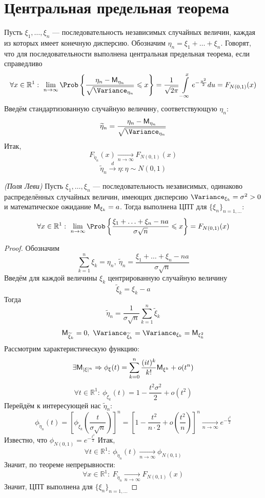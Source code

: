 \section{Центральная предельная теорема}
Пусть $\xi_1, \ldots, \xi_n$ --- последовательность независимых случайных величин, каждая из которых имеет конечную дисперсию. Обозначим $\eta_n = \xi_1 + \ldots + \xi_n$. Говорят, что для последовательности выполнена центральная предельная теорема, если справедливо
\[
	\forall x \in \mathbb{R}^1: \ \lim\limits_{n \to \infty} \Prob \left\{ \frac{\eta_n - \MExpect_{\eta_n}}{\sqrt{\Variance_{\eta_n}}} \leqslant x \right\} = \frac{1}{\sqrt{2 \pi}} \int\limits_{-\infty}^{x} e^{- \frac{u^2}{2}} du = F_{N(0,1)} (x)
\]
Введём стандартизованную случайную величину, соответствующую $\eta_n$:
\[
	\widetilde{\eta}_n = \frac{\eta_n - \MExpect_{\eta_n}}{\sqrt{\Variance_{\eta_n}}}
\]
Итак,
\[
	F_{\widetilde{\eta}_n} (x) \underset{n \to \infty}{\rightarrow} F_{N(0, 1)} (x)
\]
\[
	\widetilde{\eta}_n \overset{d}{\rightarrow} \eta: \eta \sim N(0, 1)
\]
\begin{theorem}
	\textit{(Поля Леви)} Пусть $\xi_1, \ldots, \xi_n$ --- последовательность независимых, одинаково распределённых случайных величин, имеющих дисперсию $\Variance_{\xi_k} = \sigma^2 > 0$ и математическое ожидание $\mathsf{M}_{\xi_k} = a$. Тогда выполнена ЦПТ для $\{ \xi_n \}_{n = 1, \ldots}$:
\[
	\forall x \in \mathbb{R}^1: \ \lim\limits_{n \to \infty} \Prob \left\{ \frac{\xi_1 + \ldots + \xi_n - na}{\sigma \sqrt{n}} \leqslant x \right\} = F_{N(0, 1)} (x)
\]
\end{theorem}
\begin{proof}
	Обозначим
	\[
		\sum\limits_{k = 1}^{n} \xi_k = \eta_n, \ \widetilde{\eta}_n = \frac{\xi_1 + \ldots + \xi_n - na}{\sigma \sqrt{n}} 
	\]
	Введём для каждой величины $\xi_k$ центрированную случайную величину
	\[
		\widetilde{\xi}_k = \xi_k - a
	\]
	Тогда
	\[
		\widetilde{\eta}_n = \frac{1}{\sigma \sqrt{n}} \sum\limits_{k = 1}^{n} \widetilde{\xi}_k
	\]
	\[
		\MExpect_{\widetilde{\xi}_k} = 0, \ \Variance_{\widetilde{\xi}_k} = \Variance_{\xi_k} = \MExpect_{\xi_k^2}
	\]
	Рассмотрим характеристическую функцию:
	\[
		\exists \mathsf{M}_{|\xi|^n} \Rightarrow \phi_{\xi} (t) = \sum\limits_{k = 0}^{n} \frac{(it)^k}{k!} \mathsf{M}_{\xi^k} + o(t^n)
	\]
	\[
		\forall t \in \mathbb{R}^1: \ \phi_{{\widetilde{\xi}_k}} (t) = 1 - \frac{t^2 \sigma^2}{2} + o(t^2)
	\]
	Перейдём к интересующей нас $\widetilde{\eta}_n$:
	\[
		\phi_{\widetilde{\eta}_n} (t) = \left[ \phi_{\widetilde{\xi}_k} \left( \frac{t}{\sigma \sqrt{n}} \right) \right]^n = \left[ 1 - \frac{t^2}{n \cdot 2} + o \left( \frac{t^2}{n} \right) \right]^n \underset{n \to \infty}{\rightarrow} e^{- \frac{t^2}{2}}
	\]
	Известно, что $\phi_{N(0, 1)} = e^{- \frac{t^2}{2}}$
	Итак,
	\[
		\forall t \in \mathbb{R}^1: \ \phi_{\widetilde{\eta}_n} (t) \underset{n \to \infty}{\rightarrow} \phi_{N(0, 1)}
	\]
	Значит, по теореме непрерывности:
	\[
		\forall x \in \mathbb{R}^1: \ F_{\widetilde{\eta}_n} \underset{n \to \infty}{\rightarrow} F_{N(0, 1)} (x)
	\]
	Значит, ЦПТ выполнена для $\{ \xi_n \}_{n = 1, \ldots}$
\end{proof}
